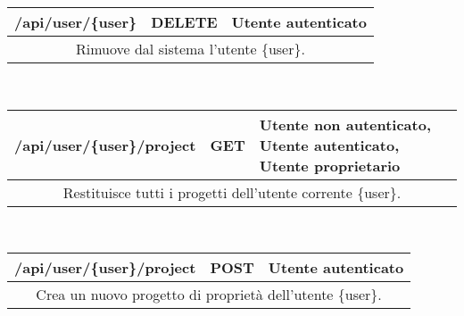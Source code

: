 \begin{table}[h]
	\begin{tabular}{|p{}|p{}|p{}|}
		\toprule
		\textbf{/api/user/\{user\}} & \textbf{DELETE} & \textbf{Utente autenticato} \\ \midrule
		\multicolumn{3}{|c|}{Rimuove dal sistema l'utente \{user\}.} \\
		\bottomrule
	\end{tabular}\\
	\par\bigskip
	
	\begin{tabular}{|p{}|p{}|p{}|}
		\toprule
		\textbf{/api/user/\{user\}/project} & \textbf{GET} & \textbf{Utente non autenticato, Utente autenticato, Utente proprietario} \\ \midrule
		\multicolumn{3}{|c|}{Restituisce tutti i progetti dell'utente corrente \{user\}.} \\
		\bottomrule
	\end{tabular}\\
	\par\bigskip
	
		\begin{tabular}{|p{}|p{}|p{}|}
		\toprule
		\textbf{/api/user/\{user\}/project} & \textbf{POST} & \textbf{Utente autenticato} \\ \midrule
		\multicolumn{3}{|c|}{Crea un nuovo progetto di proprietà dell'utente \{user\}.} \\
		\bottomrule
	\end{tabular}\\
	\par\bigskip
	
\end{table}
\newpage	
